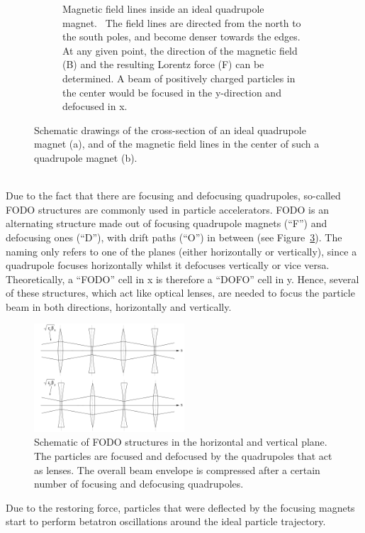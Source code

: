 \begin{figure}
\begin{subfigure}[t]{0.49\textwidth}
\caption[Magnetic field in an ideal quadrupole magnet]{Magnetic field lines inside an ideal quadrupole magnet.~\cite{QuadrupoleField}
The field lines are directed from the north to the south poles, and become denser towards the edges.
At any given point, the direction of the magnetic field (B) and the resulting Lorentz force (F) can be determined.
A beam of positively charged particles in the center would be focused in the y-direction and defocused in x.}
\label{fig:Quadrupole:field_lines}
\end{subfigure}
\caption[Schematic drawings of a quadrupole magnet]{Schematic drawings of the cross-section of an ideal quadrupole magnet (a), and of the magnetic field lines in the center of such a quadrupole magnet (b).}
\label{fig:Quadrupole}
\end{figure}
\\
Due to the fact that there are focusing and defocusing quadrupoles, so-called FODO structures are commonly used in particle accelerators.
FODO is an alternating structure made out of focusing quadrupole magnets (``F'') and defocusing ones (``D''), with drift paths (``O'') in between (see Figure~\ref{fig:FODO}).
The naming only refers to one of the planes (either horizontally or vertically), since a quadrupole focuses horizontally whilst it defocuses vertically or vice versa.
Theoretically, a ``FODO'' cell in x is therefore a ``DOFO'' cell in y.
Hence, several of these structures, which act like optical lenses, are needed to focus the particle beam in both directions, horizontally and vertically.
\begin{figure}
\centering
\includegraphics[width=0.5\textwidth]{Figures/FODO.png}
\caption[Schematic of FODO structure]{Schematic of FODO structures in the horizontal and vertical plane. The particles are focused and defocused by the quadrupoles that act as lenses. The overall beam envelope is compressed after a certain number of focusing and defocusing quadrupoles.~\cite[p. 65]{Hinterberger}}
\label{fig:FODO}
\end{figure}
Due to the restoring force, particles that were deflected by the focusing magnets start to perform betatron oscillations around the ideal particle trajectory.
